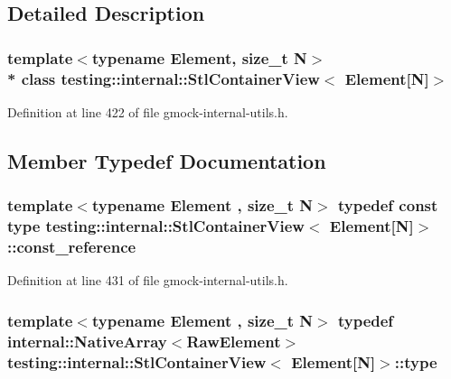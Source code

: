 \subsection{Detailed Description}
\subsubsection*{template$<$typename Element, size\+\_\+t N$>$\\*
class testing\+::internal\+::\+Stl\+Container\+View$<$ Element\mbox{[}\+N\mbox{]}$>$}



Definition at line 422 of file gmock-\/internal-\/utils.\+h.



\subsection{Member Typedef Documentation}
\subsubsection[{\texorpdfstring{const\+\_\+reference}{const_reference}}]{\setlength{\rightskip}{0pt plus 5cm}template$<$typename Element , size\+\_\+t N$>$ typedef const {\bf type} {\bf testing\+::internal\+::\+Stl\+Container\+View}$<$ Element\mbox{[}N\mbox{]}$>$\+::{\bf const\+\_\+reference}}\hypertarget{classtesting_1_1internal_1_1_stl_container_view_3_01_element[_n]_4_a481e6ab99316939484fad9c561af5e28}{}\label{classtesting_1_1internal_1_1_stl_container_view_3_01_element[_n]_4_a481e6ab99316939484fad9c561af5e28}


Definition at line 431 of file gmock-\/internal-\/utils.\+h.

\subsubsection[{\texorpdfstring{type}{type}}]{\setlength{\rightskip}{0pt plus 5cm}template$<$typename Element , size\+\_\+t N$>$ typedef {\bf internal\+::\+Native\+Array}$<$Raw\+Element$>$ {\bf testing\+::internal\+::\+Stl\+Container\+View}$<$ Element\mbox{[}N\mbox{]}$>$\+::{\bf type}}\hypertarget{classtesting_1_1internal_1_1_stl_container_view_3_01_element[_n]_4_a364efca99cc5a02829b4e3413c506b09}{}\label{classtesting_1_1internal_1_1_stl_container_view_3_01_element[_n]_4_a364efca99cc5a02829b4e3413c506b09}



